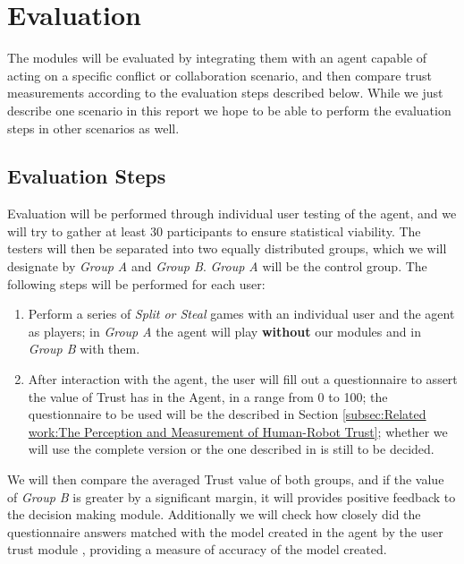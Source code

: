 \section{Evaluation}
\label{sec:Evaluation}

The modules will be evaluated by integrating them with an agent capable of acting on a specific conflict or collaboration scenario, and then compare trust measurements according to the evaluation steps described below. While we just describe one scenario in this report we hope to be able to perform the evaluation steps in other scenarios as well.

\subsection{Evaluation Steps}
\label{subsec:Evaluation:Evaluation Steps}
Evaluation will be performed through individual user testing of the agent, and we will try to gather at least 30 participants to ensure statistical viability. The testers will then be separated into two equally distributed groups, which we will designate by \textit{Group A} and \textit{Group B}. \textit{Group A} will be the control group.  The following steps will be performed for each user:

\begin{enumerate}
	\item Perform a series of \textit{Split or Steal} games with an individual user and the agent as players; in \textit{Group A} the agent will play \textbf{without} our modules and in \textit{Group B} with them.
	\item After interaction with the agent, the user will fill out a questionnaire to assert the value of Trust has in the Agent, in a range from 0 to 100; the questionnaire to be used will be the described in Section \ref{subsec:Related work:The Perception and Measurement of Human-Robot Trust}; whether we will use the complete version or the one described in %
	is still to be decided.
\end{enumerate}

We will then compare the averaged Trust value of both groups, and if the value of \textit{Group B} is greater by a significant margin, it will provides positive feedback to the decision making module. Additionally we will check how closely did the questionnaire answers matched with the model created in the agent by the user trust module %
, providing a measure of accuracy of the model created.

